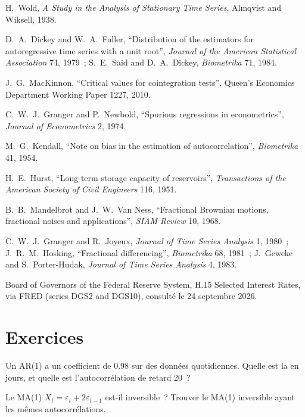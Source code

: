 \begin{omsources}
\item H.~Wold, \emph{A Study in the Analysis of Stationary Time Series}, Almqvist and Wiksell, 1938.
\item D.~A.~Dickey and W.~A.~Fuller, ``Distribution of the estimators for autoregressive time series with a unit root'', \emph{Journal of the American Statistical
Association} 74, 1979~; S.~E.~Said and D.~A.~Dickey, \emph{Biometrika} 71, 1984.
\item J.~G.~MacKinnon, ``Critical values for cointegration tests'', Queen's Economics Department Working Paper 1227, 2010.
\item C.~W.~J.~Granger and P.~Newbold, ``Spurious regressions in econometrics'', \emph{Journal of Econometrics} 2, 1974.
\item M.~G.~Kendall, ``Note on bias in the estimation of autocorrelation'', \emph{Biometrika} 41, 1954.
\item H.~E.~Hurst, ``Long-term storage capacity of reservoirs'', \emph{Transactions of the American Society of Civil Engineers} 116, 1951.
\item B.~B.~Mandelbrot and J.~W.~Van Ness, ``Fractional Brownian motions, fractional noises and applications'', \emph{SIAM Review} 10, 1968.
\item C.~W.~J.~Granger and R.~Joyeux, \emph{Journal of Time Series Analysis} 1, 1980~; J.~R.~M.~Hosking, ``Fractional differencing'', \emph{Biometrika} 68, 1981~;
J.~Geweke and S.~Porter-Hudak, \emph{Journal of Time Series Analysis} 4, 1983.
\item Board of Governors of the Federal Reserve System, H.15 Selected Interest Rates, via FRED (series DGS2 and DGS10), consulté le 24 septembre 2026.
\end{omsources}

\section{Exercices}

\begin{exercise}[$\star$]\label{exo:qm:linear-time-series:1}
Un AR(1) a un coefficient de 0.98 sur des données quotidiennes. Quelle est la  en jours, et quelle est l'autocorrélation de retard 20~?
\end{exercise}

\begin{exercise}[$\star$]\label{exo:qm:linear-time-series:2}
Le MA(1) $X_t = \varepsilon_t + 2\varepsilon_{t-1}$ est-il inversible~? Trouver le MA(1) inversible ayant les mêmes autocorrélations.
\end{exercise}

